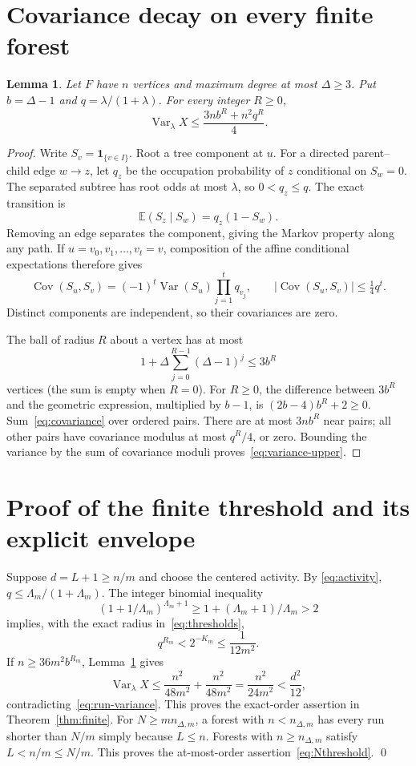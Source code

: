\documentclass[11pt]{article}
\newtheorem{lemma}[theorem]{Lemma}
\newcommand{\E}{\mathbb E}
\newcommand{\Var}{\operatorname{Var}}
\newcommand{\Cov}{\operatorname{Cov}}
\begin{document}
\section{Covariance decay on every finite forest}
\begin{lemma}\label{lem:cov}
Let $F$ have $n$ vertices and maximum degree at most $\Delta\ge3$.
Put $b=\Delta-1$ and $q=\lambda/(1+\lambda)$. For every integer $R\ge0$,
\begin{equation}\label{eq:variance-upper}
 \Var_\lambda X\le\frac{3n b^R+n^2q^R}{4}.
\end{equation}
\end{lemma}
\begin{proof}
Write $S_v=\mathbf1_{\{v\in I\}}$. Root a tree component at $u$.
For a directed parent--child edge $w\to z$, let $q_z$ be the occupation
probability of $z$ conditional on $S_w=0$. The separated subtree has
root odds at most $\lambda$, so $0<q_z\le q$. The exact transition is
\[
 \E(S_z\mid S_w)=q_z(1-S_w).
\]
Removing an edge separates the component, giving the Markov property
along any path. If $u=v_0,v_1,\ldots,v_t=v$, composition of the affine
conditional expectations therefore gives
\begin{equation}\label{eq:covariance}
 \Cov(S_u,S_v)=(-1)^t\Var(S_u)\prod_{j=1}^t q_{v_j},
 \qquad |\Cov(S_u,S_v)|\le\tfrac14q^t.
\end{equation}
Distinct components are independent, so their covariances are zero.

The ball of radius $R$ about a vertex has at most
\[
 1+\Delta\sum_{j=0}^{R-1}(\Delta-1)^j\le3b^R
\]
vertices (the sum is empty when $R=0$). For $R\ge0$, the difference
between $3b^R$ and the geometric expression, multiplied by $b-1$, is
$(2b-4)b^R+2\ge0$.
Sum~\eqref{eq:covariance} over ordered pairs. There are at most
$3nb^R$ near pairs; all other pairs have covariance modulus at most
$q^R/4$, or zero. Bounding the variance by the sum of covariance moduli
proves~\eqref{eq:variance-upper}.
\end{proof}

\section{Proof of the finite threshold and its explicit envelope}
Suppose $d=L+1\ge n/m$ and choose the centered activity. By
\eqref{eq:activity}, $q\le\Lambda_m/(1+\Lambda_m)$. The integer
binomial inequality
\[
 (1+1/\Lambda_m)^{\Lambda_m+1}
 \ge1+(\Lambda_m+1)/\Lambda_m>2
\]
implies, with the exact radius in~\eqref{eq:thresholds},
\begin{equation}\label{eq:qR}
 q^{R_m}<2^{-K_m}\le\frac1{12m^2}.
\end{equation}
If $n\ge36m^2b^{R_m}$, Lemma~\ref{lem:cov} gives
\[
 \Var_\lambda X
 \le\frac{n^2}{48m^2}+\frac{n^2}{48m^2}
 =\frac{n^2}{24m^2}
 <\frac{d^2}{12},
\]
contradicting~\eqref{eq:run-variance}. This proves the exact-order
assertion in Theorem~\ref{thm:finite}.
For $N\ge m n_{\Delta,m}$, a forest with $n<n_{\Delta,m}$ has every
run shorter than $N/m$ simply because $L\le n$. Forests with
$n\ge n_{\Delta,m}$ satisfy $L<n/m\le N/m$. This proves the
at-most-order assertion~\eqref{eq:Nthreshold}. \qed
\end{document}
